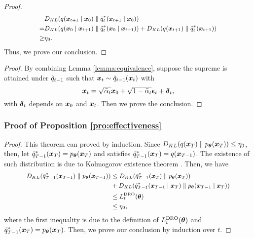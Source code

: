 \begin{proof}
	\begin{equation}
		\small
        \begin{aligned}
            &D_{KL}(q(\boldsymbol{x}_{t + 1}\mid \boldsymbol{x}_{0})\parallel \tilde{q}_{t}^{*}(\boldsymbol{x}_{t + 1}\mid \boldsymbol{x}_{0}))\\
            = &D_{KL}(q(\boldsymbol{x}_{0}\mid \boldsymbol{x}_{t + 1})\parallel \tilde{q}_{t}^{*}(\boldsymbol{x}_{0}\mid \boldsymbol{x}_{t + 1})) + D_{KL}(q(\boldsymbol{x}_{t + 1})\parallel \tilde{q}_{t}^{*}(\boldsymbol{x}_{t + 1}))\\
            \geq &\eta_{0}.  
        \end{aligned}
	\end{equation}
	Thus, we prove our conclusion.  
\end{proof}

\equivalencedro*
\begin{proof}
    By combining Lemma \ref{lemma:equivalence}, suppose the supreme is attained under $\tilde{q}_{t - 1}$ such that $\boldsymbol{x}_{t}\sim \tilde{q}_{t - 1}(\boldsymbol{x}_{t})$ with 
    \begin{equation}
        \boldsymbol{x}_{t} = \sqrt{\bar{\alpha}_{t}}\boldsymbol{x}_{0} + \sqrt{1 - \bar{\alpha}_{t}}\boldsymbol{\epsilon}_{t} + \boldsymbol{\delta}_{t},
    \end{equation}
    with $\boldsymbol{\delta}_{t}$ depends on $\boldsymbol{x}_{0}$ and $\boldsymbol{x}_{t}$. Then we prove the conclusion. 
\end{proof}

\subsubsection{Proof of Proposition \ref{pro:effectiveness}}
\effectivenessofdro*
\begin{proof}
    This theorem can proved by induction. Since $D_{KL}(q(\boldsymbol{x}_{T})\parallel p_{\boldsymbol{\theta}}(\boldsymbol{x}_{T})) \leq \eta_{0}$, then, let $\tilde{q}_{T - 1}^{*}(\boldsymbol{x}_{T}) = p_{\boldsymbol{\theta}}(\boldsymbol{x}_{T})$ and satisfies $\tilde{q}_{T - 1}^{*}(\boldsymbol{x}_{T}) = q(\boldsymbol{x}_{T - 1})$. The existence of such distribution is due to Kolmogorov existence theorem \citep{shiryaev2016probability}. Then, we have 
    \begin{equation}
    \small
    \begin{aligned}
        D_{KL}(\tilde{q}_{T - 1}^{*}(\boldsymbol{x}_{T - 1})\parallel p_{\boldsymbol{\theta}}(\boldsymbol{x}_{T - 1})) & \leq D_{KL}(\tilde{q}_{T - 1}^{*}(\boldsymbol{x}_{T})\parallel p_{\boldsymbol{\theta}}(\boldsymbol{x}_{T})) \\
        & + D_{KL}(\tilde{q}^{*}_{T - 1}(\boldsymbol{x}_{T - 1}\mid \boldsymbol{x}_{T})\parallel p_{\boldsymbol{\theta}}(\boldsymbol{x}_{T - 1}\mid \boldsymbol{x}_{T})) \\
        & \leq L_{t}^{\mathrm{DRO}}(\boldsymbol{\theta}) \\
        & \leq \eta_{0}, 
    \end{aligned}
    \end{equation}
    where the first inequality is due to the definition of $L_{t}^{\mathrm{DRO}}(\boldsymbol{\theta})$ and $\tilde{q}_{T - 1}^{*}(\boldsymbol{x}_{T}) = p_{\boldsymbol{\theta}}(\boldsymbol{x}_{T})$. Then, we prove our conclusion by induction over $t$. 
\end{proof}

